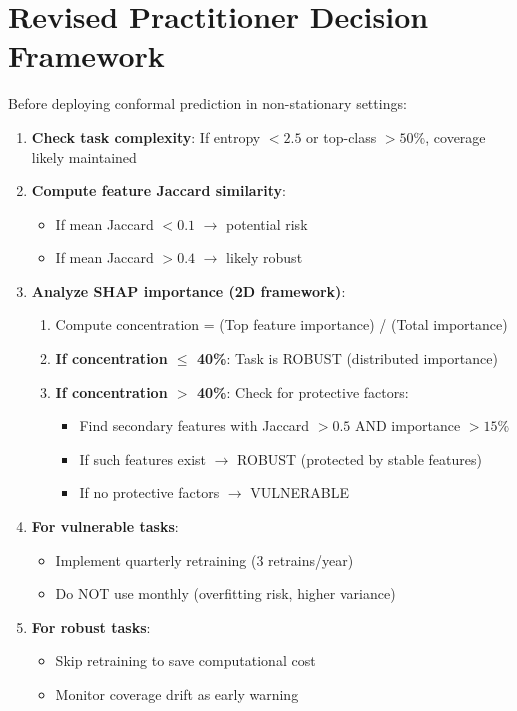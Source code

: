 
\section{Revised Practitioner Decision Framework}

Before deploying conformal prediction in non-stationary settings:

\begin{enumerate}
    \item \textbf{Check task complexity}: If entropy $< 2.5$ or top-class $> 50\%$, coverage likely maintained

    \item \textbf{Compute feature Jaccard similarity}:
    \begin{itemize}
        \item If mean Jaccard $< 0.1$ $\rightarrow$ potential risk
        \item If mean Jaccard $> 0.4$ $\rightarrow$ likely robust
    \end{itemize}

    \item \textbf{Analyze SHAP importance (2D framework)}:
    \begin{enumerate}
        \item Compute concentration = (Top feature importance) / (Total importance)
        \item \textbf{If concentration $\leq$ 40\%}: Task is ROBUST (distributed importance)
        \item \textbf{If concentration $>$ 40\%}: Check for protective factors:
        \begin{itemize}
            \item Find secondary features with Jaccard $> 0.5$ AND importance $> 15\%$
            \item If such features exist $\rightarrow$ ROBUST (protected by stable features)
            \item If no protective factors $\rightarrow$ VULNERABLE
        \end{itemize}
    \end{enumerate}

    \item \textbf{For vulnerable tasks}:
    \begin{itemize}
        \item Implement quarterly retraining (3 retrains/year)
        \item Do NOT use monthly (overfitting risk, higher variance)
    \end{itemize}

    \item \textbf{For robust tasks}:
    \begin{itemize}
        \item Skip retraining to save computational cost
        \item Monitor coverage drift as early warning
    \end{itemize}
\end{enumerate}

